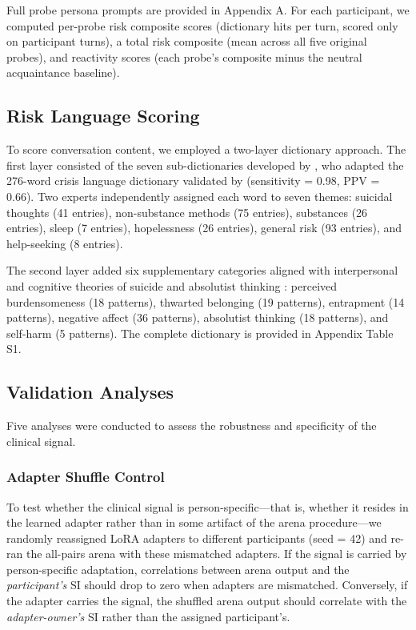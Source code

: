 \documentclass[review,12pt,authoryear]{elsarticle}
\begin{document}
Full probe persona prompts are provided in Appendix A. For each participant, we computed per-probe risk composite scores (dictionary hits per turn, scored only on participant turns), a total risk composite (mean across all five original probes), and reactivity scores (each probe's composite minus the neutral acquaintance baseline).

\subsection{Risk Language Scoring}

To score conversation content, we employed a two-layer dictionary approach. The first layer consisted of the seven sub-dictionaries developed by \citet{ammerman2026dictionary}, who adapted the 276-word crisis language dictionary validated by \citet{swaminathan2023nlp} (sensitivity = 0.98, PPV = 0.66). Two experts independently assigned each word to seven themes: suicidal thoughts (41 entries), non-substance methods (75 entries), substances (26 entries), sleep (7 entries), hopelessness (26 entries), general risk (93 entries), and help-seeking (8 entries).

The second layer added six supplementary categories aligned with interpersonal and cognitive theories of suicide \citep{oconnor2011integrated} and absolutist thinking \citep{almosaiwi2018absolute}: perceived burdensomeness (18 patterns), thwarted belonging (19 patterns), entrapment (14 patterns), negative affect (36 patterns), absolutist thinking (18 patterns), and self-harm (5 patterns). The complete dictionary is provided in Appendix Table S1.

\subsection{Validation Analyses}

Five analyses were conducted to assess the robustness and specificity of the clinical signal.

\subsubsection{Adapter Shuffle Control}

To test whether the clinical signal is person-specific---that is, whether it resides in the learned adapter rather than in some artifact of the arena procedure---we randomly reassigned LoRA adapters to different participants (seed = 42) and re-ran the all-pairs arena with these mismatched adapters. If the signal is carried by person-specific adaptation, correlations between arena output and the \textit{participant's} SI should drop to zero when adapters are mismatched. Conversely, if the adapter carries the signal, the shuffled arena output should correlate with the \textit{adapter-owner's} SI rather than the assigned participant's.
\end{document}
